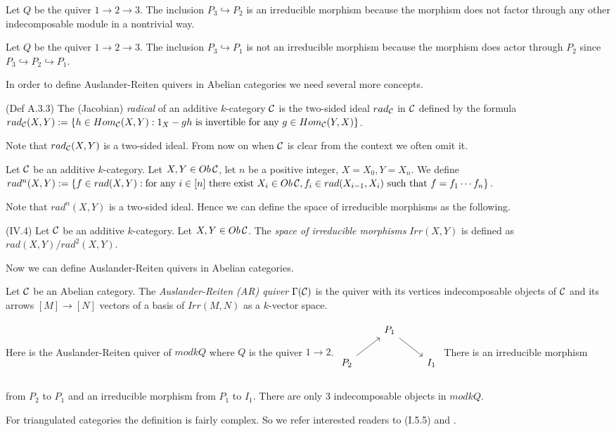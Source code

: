 \begin{example}
Let $Q$ be the quiver $1\to 2\to 3$. The inclusion $P_3\hookrightarrow P_2$ is an irreducible morphism because the morphism does not factor through any other indecomposable module in a nontrivial way.
\end{example}
\begin{example}
Let $Q$ be the quiver $1\to 2\to 3$. The inclusion $P_3\hookrightarrow P_1$ is not an irreducible morphism because the morphism does actor through $P_2$ since $P_3\hookrightarrow P_2\hookrightarrow P_1$.
\end{example}
\indent In order to define Auslander-Reiten quivers in Abelian categories we need several more concepts.\\
\begin{definition}
\cite{ASS06}(Def A.3.3) The (Jacobian) \textit{radical} of an additive $k$-category $\mathcal{C}$ is the two-sided ideal $rad_{\mathcal{C}}$ in $\mathcal{C}$ defined by the formula $rad_{\mathcal{C}}(X,Y) := \{h\in Hom_{\mathcal{C}}(X, Y): 1_X-gh\text{ is invertible for any }g\in Hom_{\mathcal{C}}(Y,X)\}$.
\end{definition}
\indent Note that $rad_{\mathcal{C}}(X, Y)$ is a two-sided ideal. From now on when $\mathcal{C}$ is clear from the context we often omit it.\\
\begin{definition}
Let $\mathcal{C}$ be an additive $k$-category. Let $X, Y\in Ob\,\mathcal{C}$, let $n$ be a positive integer, $X=X_0, Y=X_n$. We define $rad^n(X,Y):=\{f\in rad(X,Y):\text{for any }i\in [n]\text{ there exist }X_i\in Ob\,\mathcal{C}, f_i\in rad(X_{i-1}, X_{i})\text{ such that }f=f_1\cdots f_n\}$. 
\end{definition}
\indent Note that $rad^n(X, Y)$ is a two-sided ideal. Hence we can define the space of irreducible morphisms as the following.\\
\begin{definition}
\cite{ASS06}(IV.4) Let $\mathcal{C}$ be an additive $k$-category. Let $X, Y\in Ob\,\mathcal{C}$. The \textit{space of irreducible morphisms} $Irr(X,Y)$ is defined as $rad(X,Y)/rad^2(X,Y)$.
\end{definition}
\indent Now we can define Auslander-Reiten quivers in Abelian categories.\\
\begin{definition}
Let $\mathcal{C}$ be an Abelian category. The \textit{Auslander-Reiten (AR) quiver} $\Gamma(\mathcal{C})$ is the quiver with its vertices indecomposable objects of $\mathcal{C}$ and its arrows $[M]\to[N]$ vectors of a basis of $Irr(M,N)$ as a $k$-vector space.
\end{definition}
\begin{example} Here is the Auslander-Reiten quiver of $mod kQ$ where $Q$ is the quiver $1\to 2$.
$\begin{tikzcd}
&P_1\arrow[rd] &\\
P_2\arrow[ru]& &I_1\\
\end{tikzcd}$ There is an irreducible morphism from $P_2$ to $P_1$ and an irreducible morphism from $P_1$ to $I_1$. There are only 3 indecomposable objects in $mod kQ$.
\end{example}
\indent For triangulated categories the definition is fairly complex. So we refer interested readers to \cite{H88} (I.5.5) and \cite{S09}.
